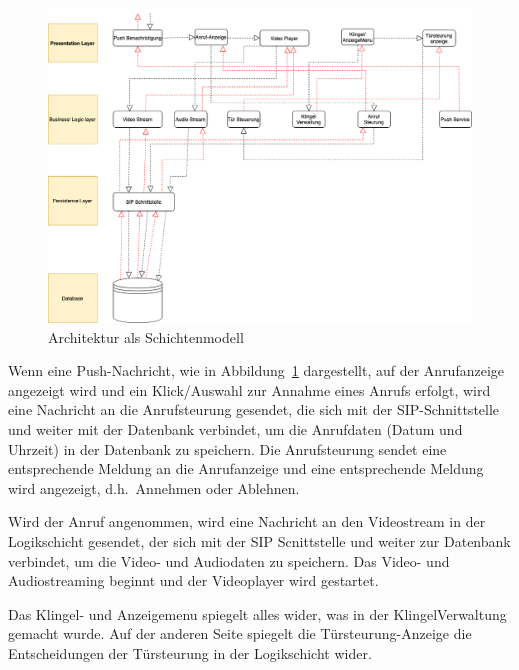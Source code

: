 \begin{figure}[ht!]
    \centering\includegraphics[width=\paperwidth/2]{../assets/img/layered-architecture-pattern.drawio}
    \caption{Architektur als Schichtenmodell}
    \label{fig:schichtenmodell}
\end{figure}
Wenn eine Push-Nachricht, wie in Abbildung~\ref{fig:schichtenmodell} dargestellt, auf der Anrufanzeige angezeigt wird und ein Klick/Auswahl zur Annahme eines Anrufs erfolgt, wird eine Nachricht an die Anrufsteurung gesendet, die sich mit der SIP-Schnittstelle und weiter mit der Datenbank verbindet, um die Anrufdaten (Datum und Uhrzeit) in der Datenbank zu speichern.
Die Anrufsteurung sendet eine entsprechende Meldung an die Anrufanzeige und eine entsprechende Meldung wird angezeigt, d.h.\ Annehmen oder Ablehnen.


Wird der Anruf angenommen, wird eine Nachricht an den Videostream in der Logikschicht gesendet, der sich mit der SIP Scnittstelle und weiter zur Datenbank verbindet, um die Video- und Audiodaten zu speichern.
Das Video- und Audiostreaming beginnt und der Videoplayer wird gestartet.


Das Klingel- und Anzeigemenu spiegelt alles wider, was in der KlingelVerwaltung gemacht wurde.
Auf der anderen Seite spiegelt die Türsteurung-Anzeige die Entscheidungen der Türsteurung in der Logikschicht wider.
